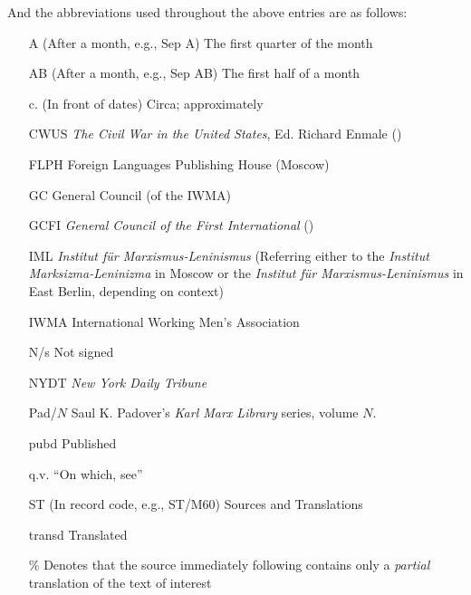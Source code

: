 And the abbreviations used throughout the above entries are as follows:

\begin{enumerate}
    \item[A] (After a month, e.g., Sep A) The first quarter of the month
    \item[AB] (After a month, e.g., Sep AB) The first half of a month
    \item[c.] (In front of dates) Circa; approximately
    \item[CWUS] \textit{The Civil War in the United States}, Ed. Richard Enmale ()
    \item[FLPH] Foreign Languages Publishing House (Moscow)
    \item[GC] General Council (of the IWMA)
    \item[GCFI] \textit{General Council of the First International} ()
    \item[IML] \textit{Institut für Marxismus-Leninismus} (Referring either to the \textit{Institut Marksizma-Leninizma} in Moscow or the \textit{Institut für Marxismus-Leninismus} in East Berlin, depending on context)
    \item[IWMA] International Working Men's Association
    \item[N/s] Not signed
    \item[NYDT] \textit{New York Daily Tribune}
    \item[Pad/$N$] Saul K. Padover's \textit{Karl Marx Library} series, volume $N$.
    \item[pubd] Published
    \item[q.v.] ``On which, see''
    \item[ST] (In record code, e.g., ST/M60) Sources and Translations
    \item[transd] Translated
    \item[\%] Denotes that the source immediately following contains only a \textit{partial} translation of the text of interest
\end{enumerate}

